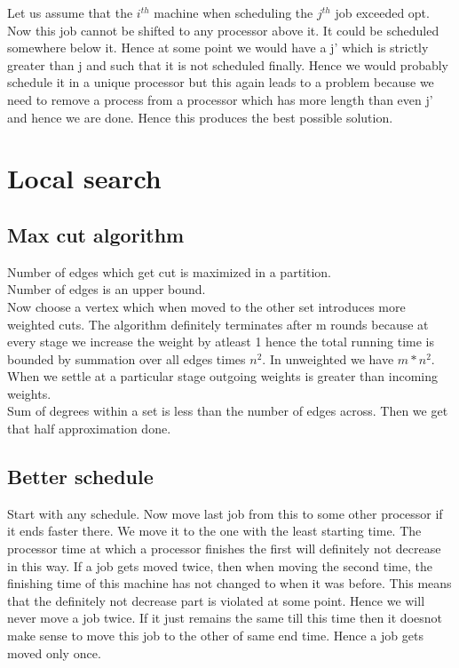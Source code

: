 \documentclass[solution,addpoints,12pt]{exam}
\begin{document}
Let us assume that the $i^{th}$ machine when scheduling the
$j^{th}$ job exceeded opt. Now this job cannot be shifted to
any processor above it. It could be scheduled somewhere below
it. Hence at some point we would have a j' which is strictly
greater than j and such that it is not scheduled finally.
Hence we would probably schedule it in a unique processor
but this again leads to a problem because we need to remove
a process from a processor which has more length than even j'
and hence we are done. Hence this produces the best possible
solution.

\section{Local search}
\subsection{Max cut algorithm}
Number of edges which get cut is maximized in a partition.\\
Number of edges is an upper bound.\\
Now choose a vertex which when moved to the other set
introduces more weighted cuts. The algorithm definitely
terminates after m rounds because at every stage we increase
the weight by atleast 1 hence
the total running time is bounded by summation
over all edges times $n^2$. In unweighted we have $m*n^2$.\\
When we settle at a particular stage outgoing
weights is greater than incoming weights.\\
Sum of degrees within a set is less than the number of edges across.
Then we get that half approximation done.

\subsection{Better schedule}
Start with any schedule. Now move last job from this to
some other processor if it ends faster there. We move it to
the one with the least starting time. The processor time at which
a processor finishes the first will definitely not decrease in this way.
If a job gets moved twice, then when moving the second time,
the finishing time of this machine has not
changed to when it was before. This means that the definitely
not decrease part is violated at some point. Hence we will
never move a job twice. If it just remains the same till
this time then it doesnot
make sense to move this job to the other of same end time.
Hence a job gets moved only once.\\
\end{document}

